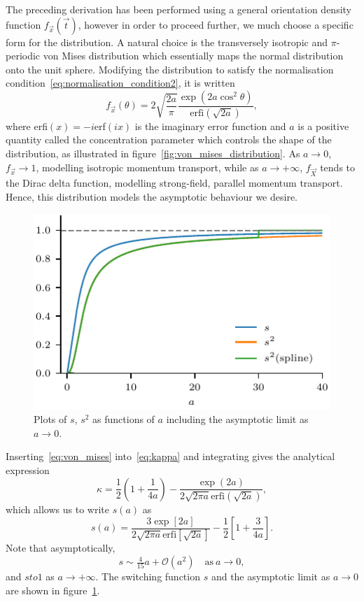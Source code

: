 The preceding derivation has been performed using a general orientation density function $f_\vec{x}(\vec{t})$, however in order to proceed further, we much choose a specific form for the distribution. A natural choice is the transversely isotropic and $\pi$-periodic von Mises distribution which essentially maps the normal distribution onto the unit sphere. Modifying the distribution to satisfy the normalisation condition~\ref{eq:normalisation_condition2}, it is written
\begin{equation}
  \label{eq:von_mises}
f_{\vec{x}}(\theta) = 2 \sqrt{\frac{2a}{\pi}} \frac{\exp(2a \cos^2 \theta)}{\text{erfi}(\sqrt{2a})},
\end{equation}
where erfi$(x) = -i$erf$(ix)$ is the imaginary error function and $a$ is a positive quantity called the concentration parameter which controls the shape of the distribution, as illustrated in figure~\ref{fig:von_mises_distribution}. As $a \to 0$, $f_{\vec{x}} \to 1$, modelling isotropic momentum transport, while as $a \to + \infty$, $f_{\vec{X}}$ tends to the Dirac delta function, modelling strong-field, parallel momentum transport. Hence, this distribution models the asymptotic behaviour we desire.

\begin{figure}[t]
  \centering
  \includegraphics[width=0.5\linewidth]{s_against_a.pdf}
  \caption{Plots of $s$, $s^2$ as functions of $a$ including the asymptotic limit as $a \to 0$.}%
  \label{fig:s_against_a}
\end{figure}

Inserting~\ref{eq:von_mises} into~\ref{eq:kappa} and integrating gives the analytical expression
\begin{equation}
  \label{eq:kappa_analytical}
\kappa = \frac{1}{2} \left( 1 + \frac{1}{4a} \right) - \frac{\exp(2a)}{2 \sqrt{2 \pi a } \text{erfi} ( \sqrt{2 a} )},
\end{equation}
which allows us to write $s(a)$ as 
\begin{equation}
  \label{eq:switching_function_a}
s(a) = \frac{3 \exp[2a]}{2\sqrt{2\pi a} \text{erfi}[\sqrt{2a}]} - \frac{1}{2}\left[ 1 + \frac{3}{4a} \right].
\end{equation}
Note that asymptotically,
\begin{equation}
  \label{eq:asymptotic_s}
s \sim \tfrac{4}{15} a + \mathcal{O}(a^2) \quad \text{as} \ a \to 0,
\end{equation}
and $s to 1$ as $a \to +\infty$. The switching function $s$ and the asymptotic limit as $a \to 0$ are shown in figure~\ref{fig:s_against_a}.

